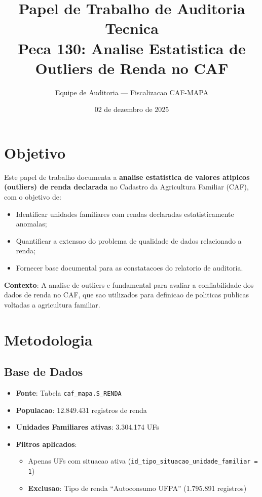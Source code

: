 \documentclass[11pt,a4paper]{article}
\title{Papel de Trabalho de Auditoria Tecnica\\
\textbf{Peca 130: Analise Estatistica de Outliers de Renda no CAF}}
\author{Equipe de Auditoria --- Fiscalizacao CAF-MAPA}
\date{02 de dezembro de 2025}
\begin{document}
\maketitle

\section{Objetivo}

Este papel de trabalho documenta a \textbf{analise estatistica de valores atipicos (outliers)
de renda declarada} no Cadastro da Agricultura Familiar (CAF), com o objetivo de:

\begin{itemize}
    \item Identificar unidades familiares com rendas declaradas estatisticamente anomalas;
    \item Quantificar a extensao do problema de qualidade de dados relacionado a renda;
    \item Fornecer base documental para as constatacoes do relatorio de auditoria.
\end{itemize}

\textbf{Contexto}: A analise de outliers e fundamental para avaliar a confiabilidade dos
dados de renda no CAF, que sao utilizados para definicao de politicas publicas voltadas
a agricultura familiar.

\section{Metodologia}

\subsection{Base de Dados}

\begin{itemize}
    \item \textbf{Fonte}: Tabela \texttt{caf\_mapa.S\_RENDA}
    \item \textbf{Populacao}: 12.849.431 registros de renda
    \item \textbf{Unidades Familiares ativas}: 3.304.174 UFs
    \item \textbf{Filtros aplicados}:
    \begin{itemize}
        \item Apenas UFs com situacao ativa (\texttt{id\_tipo\_situacao\_unidade\_familiar = 1})
        \item \textbf{Exclusao}: Tipo de renda ``Autoconsumo UFPA'' (1.795.891 registros)
    \end{itemize}
\end{itemize}
\end{document}
